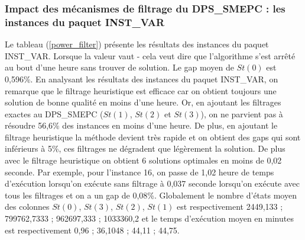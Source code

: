 \subsubsection{Impact des mécanismes de filtrage du DPS\_SMEPC : les instances du paquet INST\_VAR}
\label{B_power_filter2}
Le tableau (\ref{power_filter}) présente les résultats des instances du paquet INST\_VAR.
 Lorsque la valeur vaut \og - \fg{} cela veut dire que l'algorithme s'est arrêté au bout d'une heure sans trouver de solution.
Le gap moyen de $St(0)$ est 0,596\%.
En analysant les résultats des instances du paquet INST\_VAR, on remarque que le filtrage heuristique est efficace car on obtient toujours une solution de bonne qualité en moins d'une heure. Or, en ajoutant les filtrages exactes au DPS\_SMEPC ($St(1)$, $St(2)$ et $St(3)$), on ne parvient pas à résoudre 56,6\% des instances en moins d'une heure. De plus, en ajoutant le filtrage heuristique la méthode devient très rapide et on obtient des gaps qui sont inférieurs à 5\%, ces filtrages ne dégradent que légèrement la solution. De plus avec le filtrage heuristique on obtient 6 solutions optimales en moins de 0,02 seconde. Par exemple, pour l'instance 16, on passe de 1,02 heure de temps d'exécution lorsqu'on exécute sans filtrage à 0,037 seconde lorsqu'on exécute avec tous les filtrages et on a un gap de 0,08\%. 
Globalement le nombre d'états moyen des colonnes $St(0)$, $St(3)$, $St(2)$, $St(1)$ est respectivement 2449,133 ; 799762,7333 ; 962697,333 ; 1033360,2
et le temps d'exécution moyen en minutes est respectivement 0,96 ; 36,1048 ; 44,11 ; 44,75. 

